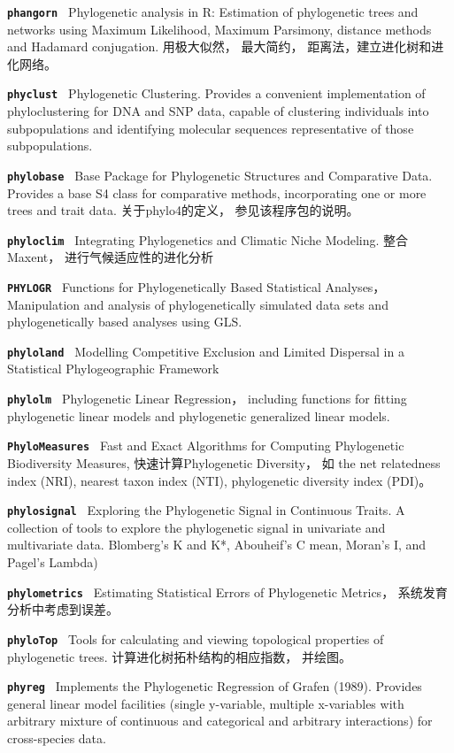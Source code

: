 \documentclass[10pt,landscape]{article}
\newcommand{\bcode}[1]{\texttt{\textbf{#1}}}
\begin{document}
\begin{CJK}{UTF8}{gbsn}
\begin{multicols}{3}
\bcode{phangorn       } Phylogenetic analysis in R: Estimation of phylogenetic trees and networks using Maximum Likelihood, Maximum Parsimony, distance methods and Hadamard conjugation. 用极大似然， 最大简约， 距离法，建立进化树和进化网络。

\bcode{phyclust       } Phylogenetic Clustering. Provides a convenient implementation of phyloclustering for DNA and SNP data, capable of clustering individuals into subpopulations and identifying molecular sequences representative of those subpopulations. 

\bcode{phylobase      } Base Package for Phylogenetic Structures and Comparative Data. Provides a base S4 class for comparative methods, incorporating one or more trees and trait data. 关于phylo4的定义， 参见该程序包的说明。 

\bcode{phyloclim      } Integrating Phylogenetics and Climatic Niche Modeling. 整合Maxent， 进行气候适应性的进化分析

\bcode{PHYLOGR        } Functions for Phylogenetically Based Statistical Analyses， Manipulation and analysis of phylogenetically simulated data sets and phylogenetically based analyses using GLS.

\bcode{phyloland      } Modelling Competitive Exclusion and Limited Dispersal in a Statistical Phylogeographic Framework

\bcode{phylolm        } Phylogenetic Linear Regression， including functions for fitting phylogenetic linear models and phylogenetic generalized linear models. 

\bcode{PhyloMeasures  } Fast and Exact Algorithms for Computing Phylogenetic Biodiversity Measures, 快速计算Phylogenetic Diversity， 如 the net relatedness index (NRI), nearest taxon index (NTI), phylogenetic diversity index (PDI)。 

\bcode{phylosignal    } Exploring the Phylogenetic Signal in Continuous Traits. A collection of tools to explore the phylogenetic signal in univariate and multivariate data. Blomberg’s K and K*, Abouheif’s C mean, Moran’s I, and Pagel’s Lambda)

\bcode{phylometrics   } Estimating Statistical Errors of Phylogenetic Metrics， 系统发育分析中考虑到误差。

\bcode{phyloTop       } Tools for calculating and viewing topological properties of phylogenetic trees. 计算进化树拓朴结构的相应指数， 并绘图。 

\bcode{phyreg         } Implements the Phylogenetic Regression of Grafen (1989). Provides general linear model facilities (single y-variable, multiple x-variables with arbitrary mixture of continuous and categorical and arbitrary interactions) for cross-species data.


\end{multicols}
\end{CJK}
\end{document}
